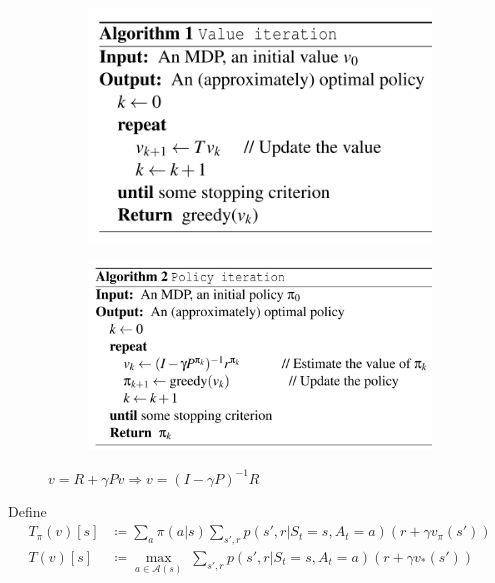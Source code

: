 \documentclass[10pt]{beamer}
\theoremstyle{remark}
\begin{document}
\begingroup
\small%
\begin{frame}

    \begin{figure}
        \begin{subfigure}{0.38\textwidth}
            \includegraphics[width=\textwidth]{figures/VI_summary.png}
        \end{subfigure}
        \begin{subfigure}{0.45\textwidth}
            \includegraphics[width=\textwidth]{figures/PI_summary.png}
        \end{subfigure}
        \caption{$v = R + \gamma P v  \Rightarrow v = (I - \gamma P)^{-1} R$}
    \end{figure}
    {
        \scriptsize
        Define
        \begin{align*}
            T_{\pi}(v)[s] &\coloneqq \sum_{a} \pi(a|s) \sum_{s', r} p(s', r| S_t = s, A_t = a) \left( r + \gamma v_\pi(s') \right)  \\
        T(v)[s] &\coloneqq \max_{a \in \mathcal{A}(s)} \; \sum_{s', r} p(s', r|  S_t =s, A_t = a)  \left( r + \gamma v_{\ast} (s') \right)
        \end{align*} 
    }


\end{frame}
\end{document}
